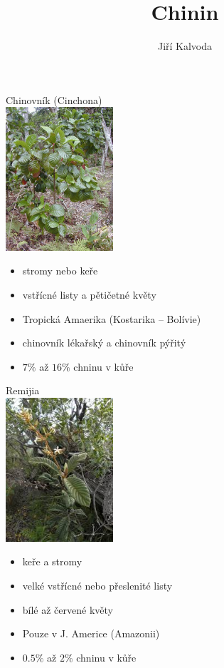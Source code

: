 \documentclass[12pt,a4paper]{article}
\begin{document}
\title{Chinin}
\author{Jiří Kalvoda}
\date{}
\maketitle
\begin{minipage}[t]{0.5\textwidth}
	\begin{center}

		{\Large Chinovník} (Cinchona)\\[10px]

		\includegraphics[width=4cm]{1.jpg}

	\end{center}
	\begin{itemize}
		\item stromy nebo keře
		\item vstřícné listy a pětičetné květy
		\item Tropická Amaerika (Kostarika -- Bolívie)
		\item chinovník lékařský a chinovník pýřitý
		\item $7\%$ až $16\%$ chninu v kůře
	\end{itemize}
\end{minipage}
\begin{minipage}[t]{0.5\textwidth}
	\begin{center}

		{\Large Remijia}\\[10px]

		\includegraphics[width=4cm]{2.jpg}

	\end{center}
	\begin{itemize}
		\item keře a stromy
		\item velké vstřícné nebo přeslenité listy
		\item bílé až červené květy
		\item Pouze v J. Americe (Amazonii)
		\item $0.5\%$ až $2\%$ chninu v kůře
	\end{itemize}

\end{minipage}\\[20px]
\end{document}
